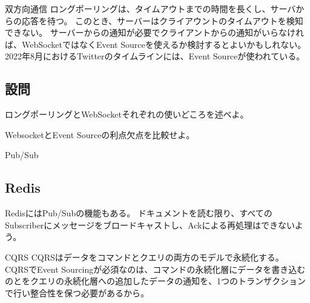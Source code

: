 \documentclass{jlreq}
\begin{document}
\begin{section-bib}{双方向通信}
  ロングポーリングは、タイムアウトまでの時間を長くし、サーバからの応答を待つ。
  このとき、サーバーはクライアウントのタイムアウトを検知できない\cite{sdi}。
  サーバーからの通知が必要でクライアントからの通知がいらなければ、WebSocketではなくEvent Sourceを使えるか検討するとよいかもしれない。
  2022年8月におけるTwitterのタイムラインには、Event Sourceが使われている。
  \subsection{設問}
  \begin{exercise}
  \item ロングポーリングとWebSocketそれぞれの使いどころを述べよ。
  \item WebsocketとEvent Sourceの利点欠点を比較せよ。
  \end{exercise}
\end{section-bib}
\begin{section-bib}{Pub/Sub}
  \subsection{Redis}
  RedisにはPub/Subの機能もある\cite{redis-pubsub}。
  ドキュメントを読む限り、すべてのSubscriberにメッセージをブロードキャストし、Ackによる再処理はできないよう。
\end{section-bib}
\begin{section-bib}{CQRS}
  CQRSはデータをコマンドとクエリの両方のモデルで永続化する\cite{microsoft-cqrs}。
  CQRSでEvent Sourcingが必須なのは、コマンドの永続化層にデータを書き込むのとをクエリの永続化層への追加したデータの通知を、1つのトランザクションで行い整合性を保つ必要があるから\cite{j5ik2o-cqrs-event-sourcing}。
\end{section-bib}
\end{document}
